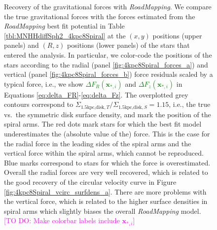 \documentclass[iop,revtex4,numberedappendix,appendixfloats]{emulateapj}
\newcommand{\vect}[1]{\boldsymbol{#1}}
\newcommand{\RM}{{\sl RoadMapping}}
\newcommand{\Wilma}[1]{\textcolor{Magenta}{#1}}
\newcommand{\NEW}[1]{\textcolor{Green}{#1}}
\newcommand{\OLD}[1]{}
\begin{document}
\begin{figure}[!htbp]
\caption{Recovery of the gravitational forces with \RM{}. We compare the true gravitational forces with the forces estimated from the \RM{} best fit potential in Table \ref{tbl:MNHHdiffSph2_4kpc8Spiral} at the $(x,y)$ positions (upper panels) and $(R,z)$ positions (lower panels) of the stars that entered the analysis. In particular, we color-code the positions of the stars according to the radial (panel \ref{fig:4kpc8Spiral_forces_a}) and vertical (panel \ref{fig:4kpc8Spiral_forces_b}) force residuals scaled by a typical force, i.e., we show \OLD{$\Delta F_R(*_i)$}\NEW{$\Delta F_R(\vect{x}_{*,i})$} and \OLD{$\Delta F_z(*_i)$}\NEW{$\Delta F_z(\vect{x}_{*,i})$} in Equations \eqref{eq:delta_FR}-\eqref{eq:delta_Fz}. The overplotted grey contours correspond to $\Sigma_{\text{1.5kpc,disk},T}/\Sigma_{\text{1.5kpc,disk},S}=1.15$, i.e., the true vs.\ the symmetric disk surface density, and mark the position of the spiral arms. The red dots mark stars for which the best fit model underestimates the (absolute value of the) force. This is the case for the radial force in the leading sides of the spiral arms and the vertical force within the spiral arms, which cannot be reproduced. Blue marks correspond to stars for which the force is overestimated. Overall the radial forces are very well recovered, which is related to the good recovery of the circular velocity curve in Figure \ref{fig:4kpc8Spiral_vcirc_surfdens_a}. There are more problems with the vertical force, which is related to the higher surface densities in spiral arms which slightly biases the overall \RM{} model. \Wilma{[TO DO: Make colorbar labels include $\vect{x}_{*,i}$]}}
\label{fig:4kpc8Spiral_forces}
\end{figure}
\end{document}
